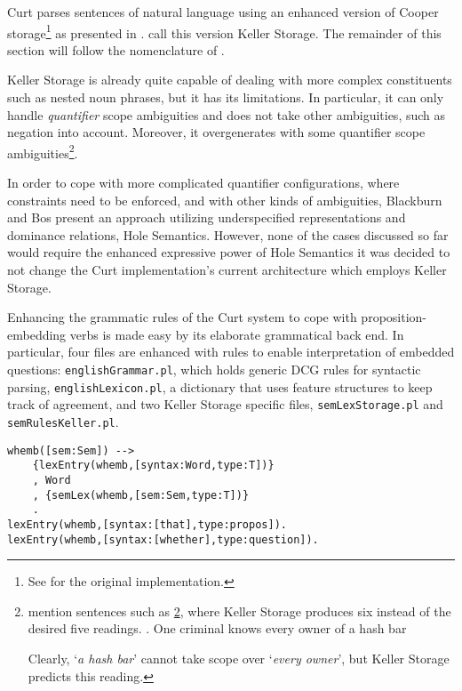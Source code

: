 \documentclass[notitlepage,twoside,a4paper]{scrreprt}
\newcommand{\abbr}{\textsf} %
\newcommand{\code}[1]{\texttt{#1}} %
\newcommand{\pn}{\textsf} %
\newcommand{\example}[1]{`\textit{#1}'} %
\newcommand{\curt}{\pn{Curt}}
\theoremstyle{remark}
\theoremstyle{remark}
\theoremstyle{definition}
\theoremstyle{definition}
\begin{document}
\curt{} parses sentences of natural language using an enhanced version of \pn{Cooper
storage}\footnote{See \cite{cooper:storage2} for the original implementation.} as
presented in \cite{keller:storage}. \cite{blackburnbos:cl1} call this version
\pn{Keller Storage}. The remainder of this section will follow the nomenclature
of \cite{blackburnbos:cl1}. 

\pn{Keller Storage} is already quite capable of dealing with more complex
constituents such as nested noun phrases, but it has its limitations. In
particular, it can only handle \emph{quantifier} scope ambiguities and does not
take other ambiguities, such as negation into account. Moreover, it
overgenerates with some quantifier scope
ambiguities\footnote{\cite{blackburnbos:cl1} mention sentences such as
\ref{ex:kellersucks}, where Keller Storage produces six instead of the desired
five readings.  \ex. One criminal knows every owner of a hash
bar\label{ex:kellersucks}

Clearly, \example{a hash bar} cannot take scope over \example{every owner}, but
Keller Storage predicts this reading.}.

In order to cope with more complicated quantifier configurations, where
constraints need to be enforced, and with other kinds of ambiguities,
Blackburn and Bos present an approach utilizing underspecified representations and
dominance relations, \pn{Hole Semantics}.
However, none of the cases discussed so far would require the enhanced
expressive power of \pn{Hole Semantics} it was decided to not change the \curt{}
implementation's current architecture which employs \pn{Keller Storage}.

Enhancing the grammatic rules of the \curt{} system to cope with
proposition-embedding verbs is made easy by its elaborate grammatical back
end. In particular, four files are enhanced with rules to enable interpretation
of embedded questions: \code{englishGrammar.pl}, which holds generic \abbr{DCG}
rules for syntactic parsing, \code{englishLexicon.pl}, a dictionary that uses
feature structures to keep track of agreement, and two \pn{Keller Storage}
specific files, \code{semLexStorage.pl} and \code{semRulesKeller.pl}.

\begin{lstlisting}[label=whemb,caption={Syntactic and Lexical Rules for Complementizers},float]
whemb([sem:Sem]) -->
    {lexEntry(whemb,[syntax:Word,type:T])}
    , Word
    , {semLex(whemb,[sem:Sem,type:T])}
    .
lexEntry(whemb,[syntax:[that],type:propos]).
lexEntry(whemb,[syntax:[whether],type:question]).
\end{lstlisting}
\end{document}
